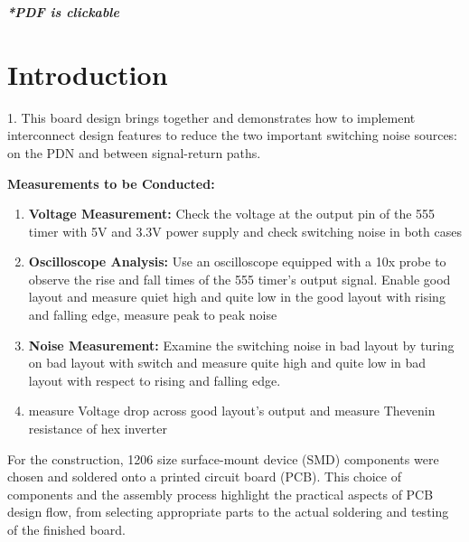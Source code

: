 \documentclass[a4paper,11pt]{article}%
\begin{document}


\pagebreak

\tableofcontents
\listoffigures
\listoftables
\vfill
\begin{center}
	\textbf{\textit{*PDF is clickable}}
\end{center}

\pagebreak

\section{Introduction}


1. This board design brings together and demonstrates how to implement interconnect
design features to reduce the two important switching noise sources: on the PDN and
between signal-return paths.

\textbf{Measurements to be Conducted:}

\begin{enumerate}
	\item \textbf{Voltage Measurement:} Check the voltage at the output pin of the 555 timer with 5V and 3.3V power supply and check switching noise in both cases
	\item \textbf{Oscilloscope Analysis:} Use an oscilloscope equipped with a 10x probe to observe the rise and fall times of the 555 timer's output signal. Enable good layout and measure quiet high and quite low in the good layout with rising and falling edge, measure peak to peak noise
	\item \textbf{Noise Measurement:} Examine the switching noise in bad layout by turing on bad layout with switch and measure quite high and quite low in bad layout with respect to rising and falling edge.
	\item measure Voltage drop across good layout's output and measure Thevenin resistance of hex inverter
\end{enumerate}

For the construction, 1206 size surface-mount device (SMD) components were chosen and soldered onto a printed circuit board (PCB). This choice of components and the assembly process highlight the practical aspects of PCB design flow, from selecting appropriate parts to the actual soldering and testing of the finished board.
\end{document}
